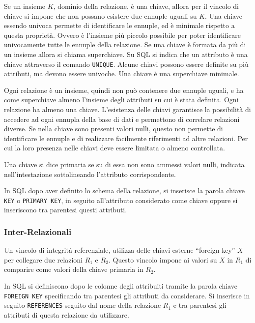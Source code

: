 \documentclass{article}
\numberwithin{equation}{subsection}
\begin{document}
Se un insieme $K$, dominio della relazione, è una chiave, allora per il vincolo di chiave si impone che non possano esistere due ennuple uguali su $K$. Una chiave 
essendo univoca permette di identificare le ennuple, ed è minimale rispetto a questa proprietà. Ovvero è l'insieme più piccolo possibile per poter identificare univocamente 
tutte le ennuple della relazione. Se una chiave è formata da più di un insieme allora si chiama superchiave. Su SQL si indica che un attributo è una chiave attraverso 
il comando \verb|UNIQUE|. Alcune chiavi possono essere definite su più attributi, ma devono essere univoche. Una chiave è una superchiave minimale. 

Ogni relazione è un insieme, quindi non può contenere due ennuple uguali, e ha come superchiave almeno l'insieme degli attributi su cui è stata definita. Ogni relazione 
ha almeno una chiave. 
L'esistenza delle chiavi garantisce la possibilità di accedere ad ogni ennupla della base di dati e permettono di correlare relazioni diverse. 
Se nella chiave sono presenti valori nulli, questo non permette di identificare le ennuple e di realizzare facilmente riferimenti ad altre relazioni. Per cui la loro 
presenza nelle chiavi deve essere limitata o almeno controllata. 

Una chiave si dice primaria se su di essa non sono ammessi valori nulli, indicata nell'intestazione sottolineando l'attributo corrispondente. 


In SQL dopo aver definito lo schema della relazione, si inserisce la parola chiave \verb|KEY| o \verb|PRIMARY KEY|, in seguito all'attributo considerato come 
chiave oppure si inseriscono tra parentesi questi attributi. 

\subsubsection{Inter-Relazionali}

Un vincolo di integrità referenziale, utilizza delle chiavi esterne ``foreign key'' $X$ per collegare due relazioni $R_1$ e $R_2$. Questo vincolo impone ai valori su 
$X$ in $R_1$ di comparire come valori della chiave primaria in $R_2$.  


In SQL si definiscono dopo le colonne degli attribuiti tramite la parola chiave \verb|FOREIGN KEY| specificando tra parentesi gli attributi da considerare. Si 
inserisce in seguito \verb|REFERENCES| seguito dal nome della relazione $R_1$ e tra parentesi gli attributi di questa relazione da utilizzare. 
\end{document}
